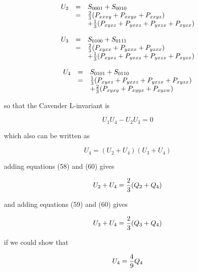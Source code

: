 \begin{equation}
\begin{array}{c c l}
U_2 & = & S_{0001} + S_{0010}\\
    & = & {2 \over 3}(P_{xxxy}+P_{xxyx}+P_{xxyz})\\
    &   & + {1 \over 3}(P_{xyxz}+P_{yxxz}+P_{yxzx}+P_{xyzx})
\end{array}
\end{equation}

\begin{equation}
\begin{array}{c c l}
U_3 & = & S_{0100} + S_{0111}\\
    & = & {2 \over 3}(P_{xyxx}+P_{yxxx}+P_{yzxx})\\
    &   &+ {1 \over 3}(P_{xyxz}+P_{yxxz}+P_{yxzx}+P_{xyzx})
\end{array}
\end{equation}

\begin{equation}
\begin{array}{c c l}
U_4 & = & S_{0101} + S_{0110}\\
    & = & {1 \over 3}(P_{xyxz}+P_{yxxz}+P_{yxzx}+P_{xyzx})\\
    &   & + {2 \over 3}(P_{xyxy}+P_{xyyx}+P_{xyzw})
\end{array}
\end{equation}

so that the Cavender L-invariant is

\begin{equation}
U_1 U_4 - U_2 U_3 = 0
\end{equation}

which also can be written as

\begin{equation}
U_4 = (U_2 + U_4) (U_3 + U_4)
\end{equation}

adding equations (58) and (60) gives

\begin{equation}
U_2 + U_4  = {2 \over 3} (Q_2 + Q_4)
\end{equation}

and adding equations (59) and (60) gives

\begin{equation}
U_3 + U_4 = {2 \over 3} (Q_3 + Q_4)
\end{equation}

if we could show that

\begin{equation}
U_4 = {4 \over 9} Q_4
\end{equation}

